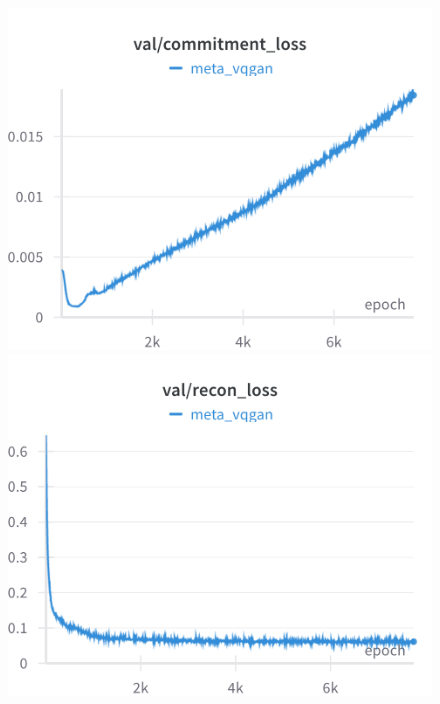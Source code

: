 \begin{figure}[H]
\includegraphics[width=\linewidth]{detailed_engineering/Meta VQGAN/charts/Section-4-Panel-2-2k8ixubhi}
\caption{}
\endminipage\hfill
{}
\includegraphics[width=\linewidth]{detailed_engineering/Meta VQGAN/charts/Section-4-Panel-3-hkj1c12xb}
\caption{}
\endminipage
\end{figure}

